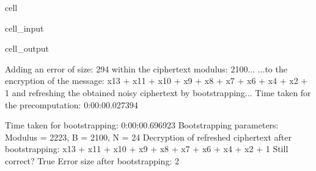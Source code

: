\documentclass[letterpaper,10pt,english]{jupyterBook}
\begin{document}
\begin{sphinxuseclass}{cell}
\begin{sphinxVerbatimInput}
\begin{sphinxuseclass}{cell_input}
\end{sphinxuseclass}\end{sphinxVerbatimInput}
\begin{sphinxVerbatimOutput}

\begin{sphinxuseclass}{cell_output}
\begin{sphinxVerbatim}[commandchars=\\\{\}]
Adding an error of size: 2\PYGZca{}94 within the ciphertext modulus: 2\PYGZca{}100...
...to the encryption of the message: x\PYGZca{}13 + x\PYGZca{}11 + x\PYGZca{}10 + x\PYGZca{}9 + x\PYGZca{}8 + x\PYGZca{}7 + x\PYGZca{}6 + x\PYGZca{}4 + x\PYGZca{}2 + 1 and refreshing the obtained noisy ciphertext by bootstrapping...
Time taken for the precomputation: 0:00:00.027394
\end{sphinxVerbatim}

\begin{sphinxVerbatim}[commandchars=\\\{\}]
Time taken for bootstrapping: 0:00:00.696923
Bootstrapping parameters: Modulus = 2\PYGZca{}223, B = 2\PYGZca{}100, N = 2\PYGZca{}4
Decryption of refreshed ciphertext after bootstrapping: x\PYGZca{}13 + x\PYGZca{}11 + x\PYGZca{}10 + x\PYGZca{}9 + x\PYGZca{}8 + x\PYGZca{}7 + x\PYGZca{}6 + x\PYGZca{}4 + x\PYGZca{}2 + 1
Still correct? True
Error size after bootstrapping: 2
\end{sphinxVerbatim}

\end{sphinxuseclass}\end{sphinxVerbatimOutput}

\end{sphinxuseclass}\label{\detokenize{Thesis:runtime-analysis}}
\begin{DUlineblock}{0em}
\item[] 
\end{DUlineblock}
\end{document}
